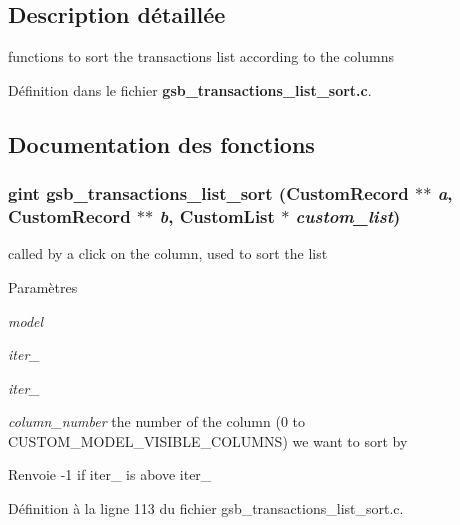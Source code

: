 \subsection{Description détaillée}
functions to sort the transactions list according to the columns 

Définition dans le fichier {\bf gsb\_\-transactions\_\-list\_\-sort.c}.



\subsection{Documentation des fonctions}
\subsubsection[{gsb\_\-transactions\_\-list\_\-sort}]{\setlength{\rightskip}{0pt plus 5cm}gint gsb\_\-transactions\_\-list\_\-sort ({\bf CustomRecord} $\ast$$\ast$ {\em a}, \/  {\bf CustomRecord} $\ast$$\ast$ {\em b}, \/  {\bf CustomList} $\ast$ {\em custom\_\-list})}\label{gsb__transactions__list__sort_8c_a3b2cd9609cb89b1c6f4af53433155300}
called by a click on the column, used to sort the list


\begin{DoxyParams}{Paramètres}
\item[{\em model}]\item[{\em iter\_\-1}]\item[{\em iter\_\-2}]\item[{\em column\_\-number}]the number of the column (0 to CUSTOM\_\-MODEL\_\-VISIBLE\_\-COLUMNS) we want to sort by\end{DoxyParams}
\begin{DoxyReturn}{Renvoie}
-\/1 if iter\_ is above iter\_ 
\end{DoxyReturn}


Définition à la ligne 113 du fichier gsb\_\-transactions\_\-list\_\-sort.c.


